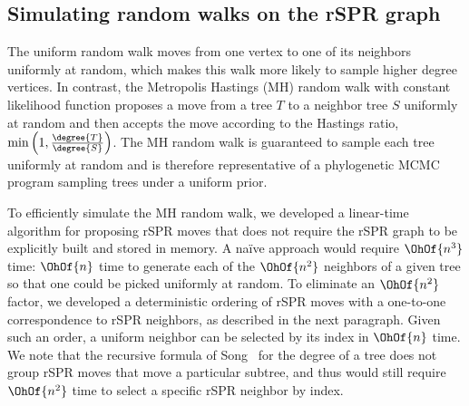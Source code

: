 \documentclass[11pt]{amsart}
\begin{document}
\subsection{Simulating random walks on the rSPR graph}
\label{sec:random_walks}
The uniform random walk moves from one vertex to one of its neighbors uniformly at random, which makes this walk more likely to sample higher degree vertices.
In contrast, the Metropolis Hastings (MH) random walk with constant likelihood function proposes a move from a tree $T$ to a neighbor tree $S$ uniformly at random and then accepts the move according to the Hastings ratio, $\min\left(1, \frac{\degree{T}}{\degree{S}}\right)$.
The MH random walk is guaranteed to sample each tree uniformly at random and is therefore representative of a phylogenetic MCMC program sampling trees under a uniform prior.

To efficiently simulate the MH random walk, we developed a linear-time algorithm for proposing rSPR moves that does not require the rSPR graph to be explicitly built and stored in memory.
A na\"ive approach would require $\OhOf{n^3}$ time: $\OhOf{n}$ time to generate each of the $\OhOf{n^2}$ neighbors of a given tree so that one could be picked uniformly at random.
To eliminate an $\OhOf{n^2}$ factor, we developed a deterministic ordering of rSPR moves with a one-to-one correspondence to rSPR neighbors, as described in the next paragraph.
Given such an order, a uniform neighbor can be selected by its index in $\OhOf{n}$ time.
We note that the recursive formula of Song~\cite{Song2003-gf} for the degree of a tree does not group rSPR moves that move a particular subtree, and thus would still require $\OhOf{n^2}$ time to select a specific rSPR neighbor by index.
\end{document}
